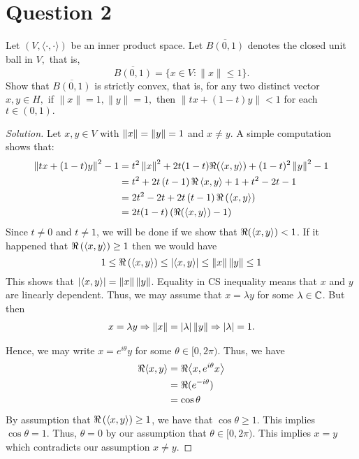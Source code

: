 \section{Question 2}

\horz

Let $(V,\langle \cdot, \cdot \rangle)$ be an inner product space. Let $\overline{B(0,1)}$ denotes the closed unit ball in $V,$ that is, $$\overline{B(0,1)} = \{x\in V : \|x\|\leqslant 1\}.$$
Show that $\overline{B(0,1)}$ is strictly convex, that is, for any two distinct vector $x,y\in H,$ if $\|x\|=1, \|y\|=1,$ then $\|tx+(1-t)y\| < 1$ for each $t\in (0,1).$
 
\horz

\begin{proof}[Solution]
    Let $x,y \in V$ with $\left\lVert x \right\rVert=\left\lVert y \right\rVert=1$ and $x\ne y$. A simple computation shows that: 
    \begin{align*}
	\left\lVert tx+(1-t)y \right\rVert^{2} -1 &= t^{2} \left\lVert x \right\rVert^{2} + 2t(1-t)\Re(\left\langle x,y \right\rangle) + (1-t)^{2} \left\lVert y \right\rVert^{2}  -1 \\
	&= t^{2} +2t\left( t-1 \right) \Re\left\langle x,y \right\rangle + 1+t^{2}-2t -1 \\
	&= 2t^{2} -2t + 2t\left( t-1 \right) \Re\left( \left\langle x,y \right\rangle \right) \\
	    &= 2t(1-t) \left( \Re (\left\langle x,y \right\rangle) -1 \right)
	\end{align*}
	Since $t\ne 0$ and $t\ne 1$, we will be done if we show that $\Re (\left\langle x,y \right\rangle) < 1$. If it happened that $\Re \left( \left\langle x,y \right\rangle \right) \ge 1$ then we would have
	\begin{equation*}
	    1 \le \Re  \left( \left\langle x,y \right\rangle \right) \le \left\lvert \left\langle x,y \right\rangle \right\rvert \le \left\lVert x \right\rVert \left\lVert y \right\rVert \le 1
	\end{equation*}
	This shows that $\left\lvert \left\langle x,y \right\rangle \right\rvert = \left\lVert x \right\rVert\left\lVert y \right\rVert$. Equality in CS inequality means that $x$ and $y$ are linearly dependent. Thus, we may assume that $x=\lambda y$ for some $\lambda \in \mathbb C$. But then
	\begin{align*}
	    x= \lambda y \Rightarrow \left\lVert x \right\rVert = \left\lvert \lambda \right\rvert\left\lVert y \right\rVert \Rightarrow \left\lvert \lambda \right\rvert=1\text{.}
	\end{align*}

	Hence, we may write $x=e^{i\theta} y$ for some $\theta \in [0,2\pi)$. Thus, we have
	\begin{align*}
	    \Re{\left\langle x,y \right\rangle} &= \Re {\left\langle x, e^{i\theta} x \right\rangle} \\
	    &= \Re{(e^{-i\theta})} \\
	    &= \cos \theta 
	\end{align*}
	By assumption that $\Re \left( \left\langle x,y \right\rangle \right) \ge 1$, we have that $\cos \theta \ge 1$. This implies $\cos \theta = 1$. Thus, $\theta = 0$ by our assumption that $\theta \in [0, 2\pi)$. This implies $x=y$ which contradicts our assumption $x\ne y$.
\end{proof}
